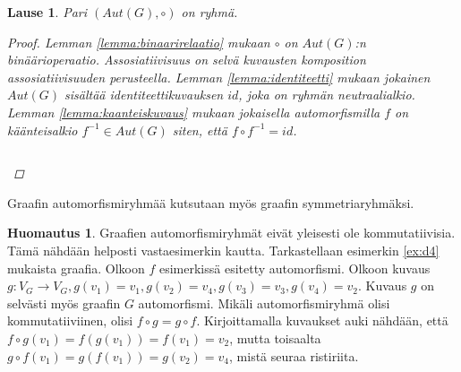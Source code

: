 \documentclass[a4paper, 12pt]{article}
\theoremstyle{definition}
\newtheorem{huom}{Huomautus}
\theoremstyle{plain}
\newtheorem{teor}[mydef]{Lause}
\begin{document}
\begin{teor}
Pari $(Aut(G), \circ)$ on ryhmä.
\begin{proof}
Lemman \ref{lemma:binaarirelaatio} mukaan $\circ$ on $Aut(G)$:n binäärioperaatio. Assosiatiivisuus on selvä kuvausten komposition assosiatiivisuuden perusteella. Lemman \ref{lemma:identiteetti} mukaan jokainen $Aut(G)$ sisältää identiteettikuvauksen $id$, joka on ryhmän neutraalialkio. Lemman \ref{lemma:kaanteiskuvaus} mukaan jokaisella automorfismilla $f$ on käänteisalkio $f^{-1} \in Aut(G)$ siten, että $f \circ f^{-1} = id$.
\begin{center}
\begin{math}
\end{math}
\end{center}
\end{proof}
\end{teor}

Graafin automorfismiryhmää kutsutaan myös graafin symmetriaryhmäksi.

\begin{huom}
Graafien automorfismiryhmät eivät yleisesti ole kommutatiivisia.\\
Tämä nähdään helposti vastaesimerkin kautta. Tarkastellaan esimerkin \ref{ex:d4} mukaista graafia. Olkoon $f$ esimerkissä esitetty automorfismi. Olkoon kuvaus $g: V_G \rightarrow V_G, g(v_1) = v_1, g(v_2) = v_4, g(v_3) = v_3, g(v_4) = v_2$. Kuvaus $g$ on selvästi myös graafin $G$ automorfismi. Mikäli automorfismiryhmä olisi kommutatiiviinen, olisi $f \circ g = g \circ f$. Kirjoittamalla kuvaukset auki nähdään, että $f \circ g(v_1) = f(g(v_1)) = f(v_1) = v_2$, mutta toisaalta $g \circ f (v_1) = g(f(v_1)) = g(v_2) = v_4$, mistä seuraa ristiriita.
\end{huom}
\end{document}
